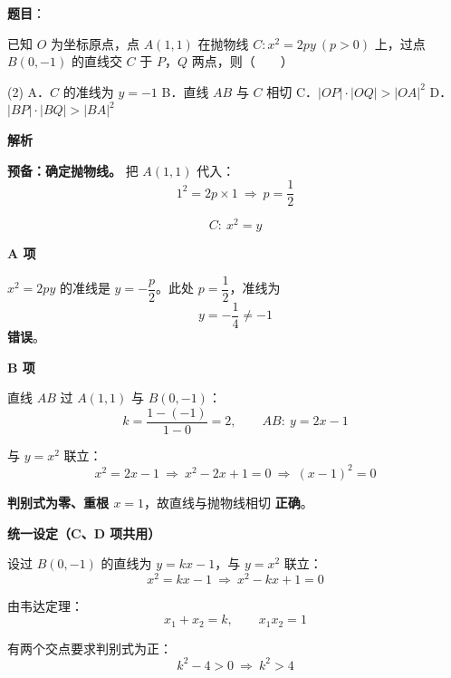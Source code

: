 \begin{answer}

\textbf{题目}：

已知 $O$ 为坐标原点，点 $A(1,1)$ 在抛物线 $C:x^{2}=2py\ (p>0)$ 上，过点 $B(0,-1)$ 的直线交 $C$ 于 $P$，$Q$ 两点，则\mbox{（　　）}

\begin{gkopts}(2)
\task A．$C$ 的准线为 $y=-1$
\task B．直线 $AB$ 与 $C$ 相切
\task C．$|OP|\cdot|OQ|>|OA|^{2}$
\task D．$|BP|\cdot|BQ|>|BA|^{2}$
\end{gkopts}

\textbf{解析}

\textbf{预备：确定抛物线。} 把 $A(1,1)$ 代入：
\nopagebreak[4]
\[1^{2}=2p\times1\ \Longrightarrow\ p=\frac12\]

\nopagebreak[4]
\[C:\ x^{2}=y\]

\par\medskip

\textbf{A 项 }

$x^{2}=2py$ 的准线是 $y=-\dfrac p2$。此处 $p=\dfrac12$，准线为
\nopagebreak[4]
\[y=-\frac14\ne-1\]
 \textbf{错误}。

\par\medskip

\textbf{B 项 }

直线 $AB$ 过 $A(1,1)$ 与 $B(0,-1)$：
\nopagebreak[4]
\[k=\frac{1-(-1)}{1-0}=2,\qquad AB:\ y=2x-1\]

与 $y=x^{2}$ 联立：
\nopagebreak[4]
\[x^{2}=2x-1\ \Longrightarrow\ x^{2}-2x+1=0\ \Longrightarrow\ (x-1)^{2}=0\]

\textbf{判别式为零、重根 $x=1$}，故直线与抛物线相切  \textbf{正确}。

\par\medskip

\textbf{统一设定（C、D 项共用）}

设过 $B(0,-1)$ 的直线为 $y=kx-1$，与 $y=x^{2}$ 联立：
\nopagebreak[4]
\[x^{2}=kx-1\ \Longrightarrow\ x^{2}-kx+1=0\]

由韦达定理：
\nopagebreak[4]
\[x_1+x_2=k,\qquad x_1x_2=1\]

有两个交点要求判别式为正：
\nopagebreak[4]
\[k^{2}-4>0\ \Longrightarrow\ k^{2}>4\]

\par\medskip


\end{answer}
